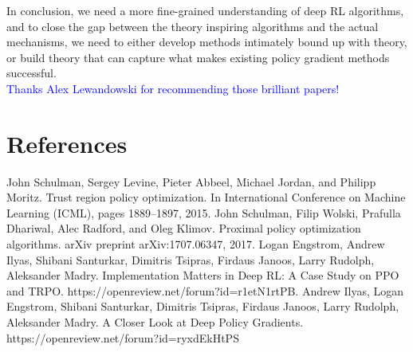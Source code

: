 \documentclass{article}
\begin{document}
In conclusion, we need a more fine-grained understanding of deep RL algorithms, and to close the gap between the theory inspiring algorithms and the actual mechanisms, we need to either develop methods intimately bound up with theory, or build theory that can capture what makes existing policy gradient methods successful. \\

\textcolor{blue}{Thanks Alex Lewandowski for recommending those brilliant papers!}

\section{References}
\begin{thebibliography}{99}  
John Schulman, Sergey Levine, Pieter Abbeel, Michael Jordan, and Philipp Moritz. Trust region policy optimization. In International Conference on Machine Learning (ICML), pages 1889–1897, 2015.
John Schulman, Filip Wolski, Prafulla Dhariwal, Alec Radford, and Oleg Klimov. Proximal policy optimization algorithms. arXiv preprint arXiv:1707.06347, 2017.
Logan Engstrom, Andrew Ilyas, Shibani Santurkar, Dimitris Tsipras, Firdaus Janoos, Larry Rudolph, Aleksander Madry. Implementation Matters in Deep RL: A Case Study on PPO and TRPO. https://openreview.net/forum?id=r1etN1rtPB.
Andrew Ilyas, Logan Engstrom, Shibani Santurkar, Dimitris Tsipras, Firdaus Janoos, Larry Rudolph, Aleksander Madry. A Closer Look at Deep Policy Gradients. https://openreview.net/forum?id=ryxdEkHtPS
\end{thebibliography}
\end{document}
